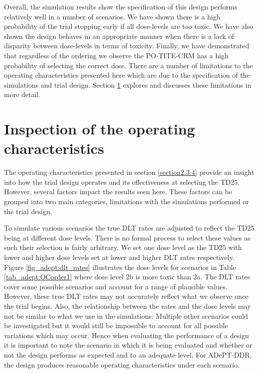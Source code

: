 Overall, the simulation results show the specification of this design performs relatively well in a number of scenarios. We have shown there is a high probability of the trial stopping early if all dose-levels are too toxic. We have also shown the design behaves in an appropriate manner when there is a lack of disparity between dose-levels in terms of toxicity. Finally, we have demonstrated that regardless of the ordering we observe the PO-TITE-CRM has a high probability of selecting the correct dose. There are a number of limitations to the operating characteristics presented here which are due to the specification of the simulations and trial design. Section \ref{section2.4} explores and discusses these limitations in more detail.


\section{Inspection of the operating characteristics}  
\label{section2.4}%

The operating characteristics presented in section \ref{section2.3.4} provide an insight into how the trial design operates and its effectiveness at selecting the TD25. However, several factors impact the results seen here. These factors can be grouped into two main categories, limitations with the simulations performed or the trial design.

To simulate various scenarios the true DLT rates are adjusted to reflect the TD25 being at different dose levels. There is no formal process to select these values as such their selection is fairly arbitrary. We set one dose level as the TD25 with lower and higher dose levels set at lower and higher DLT rates respectively. Figure \ref{fig_adept:dlt_rates} illustrates the dose levels for scenarios in Table \ref{tab_adept:OCorder1} where dose level 2b is more toxic than 2a. The DLT rates cover some possible scenarios and account for a range of plausible values. However, these true DLT rates may not accurately reflect what we observe once the trial begins. Also, the relationship between the rates and the dose levels may not be similar to what we use in the simulations. Multiple other scenarios could be investigated but it would still be impossible to account for all possible variations which may occur. Hence when evaluating the performance of a design it is important to note the scenario in which it is being evaluated and whether or not the design performs as expected and to an adequate level. For ADePT-DDR, the design produces reasonable operating characteristics under each scenario. 

